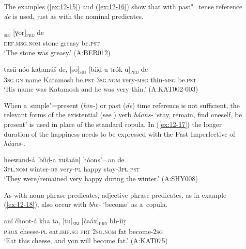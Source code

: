 The examples (\ref{ex:12-15}) and (\ref{ex:12-16}) show that with past"=tense reference \textit{de} is used, just as with the nominal predicates.

\begin{exe}
\ex
\label{ex:12-15}
\gll [so báaṭ]\textsubscript{\textsc{sbj}} [ɣoṛ]\textsubscript{\textsc{prd}} de \\
\textsc{def.msg.nom} stone greasy be.\textsc{pst} \\
\glt `The stone was greasy.' (A:BER012)
\end{exe}
\begin{exe}
\ex
\label{ex:12-16}
\gll tasíi nóo kaṭamúš de, [so]\textsubscript{\textsc{sbj}} [bíiḍ-u trók-u]\textsubscript{\textsc{prd}} de \\
\textsc{3sg.gn} name Katamosh be.\textsc{pst} \textsc{3sg.nom} very-\textsc{msg}  thin-\textsc{msg} be.\textsc{pst} \\
\glt `His name was Katamosh and he was very thin.' (A:KAT002-003)
\end{exe}

When a~simple"=present (\textit{hin-}) or past (\textit{de}) time reference is not sufficient, the relevant forms of the existential (see ) verb \textit{háans-} `stay, remain, find oneself, be present' is used in place of the standard copula. In (\ref{ex:12-17}) the longer duration of the happiness needs to be expressed with the Past Imperfective of \textit{háans-}.

\begin{exe}
\ex
\label{ex:12-17}
\gll [se] heewand-á [bíiḍ-a xušaán] hóons"=an de \\
\textsc{3pl.nom} winter-\textsc{ob} very-\textsc{pl} happy stay-\textsc{3pl} \textsc{pst} \\
\glt `They were/remained very happy during the winter.' (A:SHY008)
\end{exe}

As with noun phrase predicates, adjective phrase predicates, as in example (\ref{ex:12-18}), also occur with \textit{bhe-} `become' as a~copula.

\begin{exe}
\ex
\label{ex:12-18}
\gll aní čhoot-á kha ta, [tu]\textsubscript{\textsc{sbj}} [čaáx]\textsubscript{\textsc{prd}} bh-íiṛ \\
\textsc{prox} cheese-\textsc{pl} eat.\textsc{imp.sg} \textsc{prt} \textsc{2sg.nom} fat become-\textsc{2sg} \\
\glt `Eat this cheese, and you will become fat.' (A:KAT075)
\end{exe}

